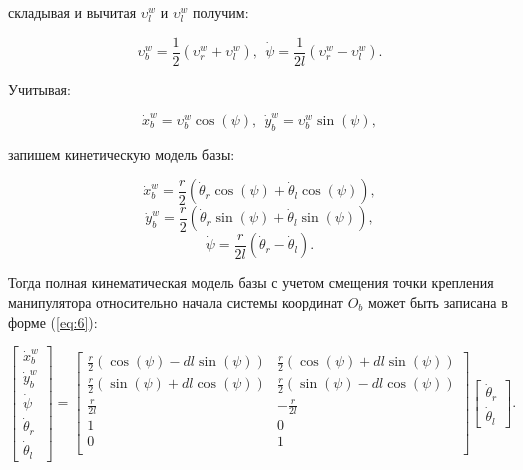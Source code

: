 \documentclass[14pt, a4paper]{extreport}
\begin{document}
\noindent
складывая и вычитая $\upsilon_l^w$ и $\upsilon_l^w$ получим:

\begin{equation}
\upsilon_b^w = \frac{1}{2}(\upsilon_r^w + \upsilon_l^w),\ \ \dot{\psi} = \frac{1}{2l}(\upsilon_r^w - \upsilon_l^w).
\tag{15} \label{eq:15}
\end{equation}

Учитывая:

\begin{equation}
\dot{x}_b^w = \upsilon_b^w\cos(\psi) ,\ \ \dot{y}_b^w = \upsilon_b^w\sin(\psi),
\tag{16} \label{eq:16}
\end{equation}

\noindent
запишем кинетическую модель базы:

\begin{equation}
\dot{x}_b^w = \frac{r}{2}(\dot{\theta}_r\cos(\psi) + \dot{\theta}_l\cos(\psi)),
\tag{17} \label{eq:17}
\end{equation}
\begin{equation}
\dot{y}_b^w = \frac{r}{2}(\dot{\theta}_r\sin(\psi) + \dot{\theta}_l\sin(\psi)),
\tag{18} \label{eq:18}
\end{equation}
\begin{equation}
\dot{\psi} = \frac{r}{2l}(\dot{\theta}_r - \dot{\theta}_l).
\tag{19} \label{eq:19}
\end{equation}

Тогда полная кинематическая модель базы с учетом смещения точки крепления манипулятора относительно начала системы координат $O_b$ может быть записана в форме (\ref{eq:6}):

\begin{equation}
\begin{bmatrix}
\dot{x}^w_b\\[1mm] \dot{y}^w_b\\[1mm] \dot{\psi}\\[1mm] \dot{\theta}_r\\[1mm] \dot{\theta}_l
\end{bmatrix} = 
\begin{bmatrix}
\frac{r}{2}(\cos(\psi) - dl\sin(\psi)) & \frac{r}{2}(\cos(\psi) + dl\sin(\psi))\\[1mm]
\frac{r}{2}(\sin(\psi) + dl\cos(\psi)) & \frac{r}{2}(\sin(\psi) - dl\cos(\psi))\\[1mm]
\frac{r}{2l} & -\frac{r}{2l}\\[1mm]
1 & 0\\[1mm]
0 & 1\\[1mm]
\end{bmatrix}
\begin{bmatrix}
\dot{\theta}_r\\[1mm] \dot{\theta}_l
\end{bmatrix}.
\tag{20} \label{eq:20}
\end{equation}
\newpage
\end{document}

